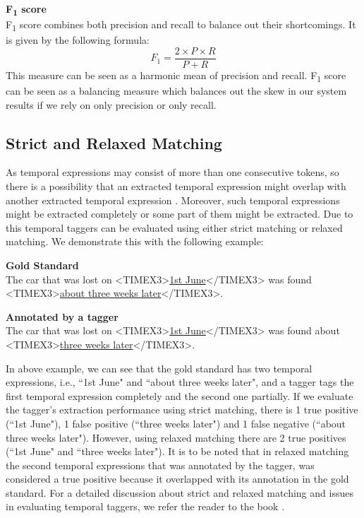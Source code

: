 \textbf{F\textsubscript{1} score}\\
F\textsubscript{1} score combines both precision and recall to balance out their shortcomings. It is given by the following formula: 
$$F_1 = \frac{2\times P\times R}{P+R}$$ 
This measure can be seen as a harmonic mean of precision and recall. F\textsubscript{1} score can be seen as a balancing measure which balances out the skew in our system results if we rely on only precision or only recall.

\subsection{Strict and Relaxed Matching}
As temporal expressions may consist of more than one consecutive tokens, so there is a possibility that an extracted temporal expression might overlap with another extracted temporal expression \cite{DBLP:series/synthesis/2016Strotgen}. Moreover, such temporal expressions might be extracted completely or some part of them might be extracted. Due to this temporal taggers can be evaluated using either strict matching or relaxed matching. We demonstrate this with the following example:

\begin{mdframed}[style=MyFrame]
	\raggedright{
		\textbf{Gold Standard}\\
		The car that was lost on <TIMEX3>\underline{1st June}</TIMEX3> was found <TIMEX3>\underline{about three weeks later}</TIMEX3>. 
		
		\textbf{Annotated by a tagger}\\
		The car that was lost on <TIMEX3>\underline{1st June}</TIMEX3> was found about <TIMEX3>\underline{three weeks later}</TIMEX3>. 
	}
\end{mdframed}

In above example, we can see that the gold standard has two temporal expressions, i.e.,  ``1st June" and ``about three weeks later", and a tagger tags the first temporal expression completely and the second one partially. If we evaluate the tagger's extraction performance using strict matching, there is 1 true positive (``1st June"), 1 false positive (``three weeks later") and 1 false negative (``about three weeks later"). However, using relaxed matching there are 2 true positives (``1st June" and ``three weeks later"). It is to be noted that in relaxed matching the second temporal expressions that was annotated by the tagger, was considered a true positive because it overlapped with its annotation in the gold standard. For a detailed discussion about strict and relaxed matching and issues in evaluating temporal taggers, we refer the reader to the book \cite{DBLP:series/synthesis/2016Strotgen}.


